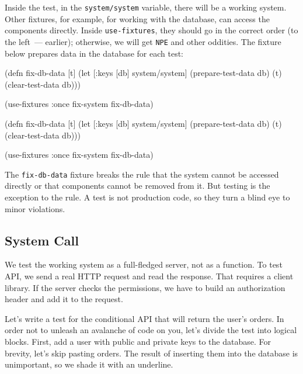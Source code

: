 Inside the test, in the \verb|system/system| variable, there will be a working system. Other fixtures, for example, for working with the database, can access the components directly. Inside \verb|use-fixtures|, they should go in the correct order (to the left~--- earlier); otherwise, we will get \verb|NPE| and other oddities. The fixture below prepares data in the database for each test:


\ifnarrow

\begin{english}
  \begin{clojure}
(defn fix-db-data
  [t]
  (let [{:keys [db]} system/system]
    (prepare-test-data db)
    (t)
    (clear-test-data db)))

(use-fixtures :once
  fix-system fix-db-data)
  \end{clojure}
\end{english}

\else

\begin{english}
  \begin{clojure}
(defn fix-db-data
  [t]
  (let [{:keys [db]} system/system]
    (prepare-test-data db)
    (t)
    (clear-test-data db)))

(use-fixtures :once fix-system fix-db-data)
  \end{clojure}
\end{english}

\fi

The \verb|fix-db-data| fixture breaks the rule that the system cannot be accessed directly or that components cannot be removed from it. But testing is the exception to the rule. A test is not production code, so they turn a blind eye to minor violations.

\subsection{System Call}

We test the working system as a full-fledged server, not as a function. To test API, we send a real HTTP request and read the response. That requires a client library. If the server checks the permissions, we have to build an authorization header and add it to the request.

Let's write a test for the conditional API that will return the user's orders. In order not to unleash an avalanche of code on you, let's divide the test into logical blocks. First, add a user with public and private keys to the database. For brevity, let's skip pasting orders. The result of inserting them into the database is unimportant, so we shade it with an underline.


